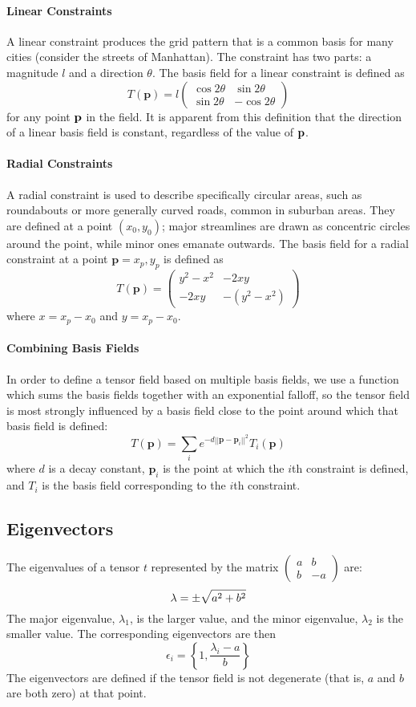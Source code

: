 \documentclass[twocolumn]{article}
\newcommand{\sqmat}[4]{\ensuremath{
    \left(\begin{array}{cc}
        #1 & #2 \\
        #3 & #4
    \end{array}\right)}}
\newcommand{\pt}{\textbf{p}}
\begin{document}
\paragraph{Linear Constraints}
A linear constraint produces the grid pattern that is a common basis for many
cities (consider the streets of Manhattan). The constraint has two parts: a
magnitude $l$ and a direction $\theta$. The basis field for a linear constraint
is defined as
\[
    T(\pt) =
        l\sqmat{\cos{2\theta}}{\sin{2\theta}}{\sin{2\theta}}{-\cos{2\theta}}
\]
for any point $\bf p$ in the field. It is apparent from this definition that
the direction of a linear basis field is constant, regardless of the value of
$\bf p$.

\paragraph{Radial Constraints}
A radial constraint is used to describe specifically circular areas, such as
roundabouts or more generally curved roads, common in suburban areas. They are
defined at a point $(x_0,y_0)$; major streamlines are drawn as concentric
circles
around the point, while minor ones emanate outwards. The basis field for a
radial constraint at a point $\pt=x_p,y_p$ is defined as
\[
    T(\pt) = \sqmat{y^2-x^2}{-2xy}{-2xy}{-(y^2-x^2)}
\]
where $x=x_p-x_0$ and $y=x_p-x_0$.

\paragraph{Combining Basis Fields}
In order to define a tensor field based on multiple basis fields, we use a
function which sums the basis fields together with an exponential falloff,
so the tensor field is most strongly influenced by a basis field close to
the point around which that basis field is defined:
\[
    T(\pt) = \sum_i e^{-d||\pt-\pt_i||^2}T_i(\pt)
\]
where $d$ is a decay constant, $\pt_i$ is the point at which the $i$th
constraint is defined, and $T_i$ is the basis field corresponding to the $i$th
constraint.

\subsection{Eigenvectors}
The eigenvalues of a tensor $t$ represented by the matrix $\sqmat{a}{b}{b}{-a}$
are:
\[
    \lambda = \pm\sqrt{a^2+b^2} \\
\]
The major eigenvalue, $\lambda_1$, is the larger value, and the minor
eigenvalue, $\lambda_2$ is the smaller value. The corresponding eigenvectors
are then
\[
    \epsilon_i = \left\{1,\frac{\lambda_i-a}{b}\right\}
\]
The eigenvectors are defined if the tensor field is not degenerate (that is,
$a$ and $b$ are both zero) at that point.
\end{document}
